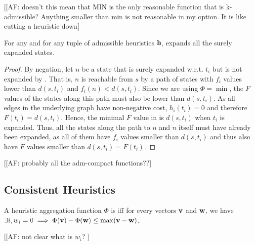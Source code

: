 [[AF: doesn't this mean that MIN is the only reasonable function that is k-admissible? Anything smaller than min is not reasonable in my option. It is like cutting a heuristic down]

\begin{theorem}
  \label{the:kastarmin-surely}
  For any \kgs and for any tuple of admissible heuristics $\mathbf{h}$, \kastarmin expands all the surely expanded states.
\end{theorem}
\begin{proof}
  By negation, let $n$ be a state that is surely expanded w.r.t. $t_i$ but is not expanded by \kastarmin.
  That is, $n$ is reachable from $s$ by a path of states with $f_i$  values lower than $d(s, t_i)$ and $f_i(n) < d(s, t_i)$.
  Since we are using $\Phi = \min$, the $F$ values of the states along this path must also be lower than $d(s, t_i)$.
  As all edges in the underlying graph have non-negative cost, $h_i(t_i) = 0$ and therefore $F(t_i) = d(s, t_i)$.
  Hence, the minimal $F$ value in \open is $d(s, t_i)$ when $t_i$ is expanded.
  Thus, all the states along the path to $n$ and $n$ itself must have already been expanded, as all of them have $f_i$ values smaller than $d(s, t_i)$ and thus also have $F$ values smaller than $d(s, t_i) = F(t_i)$.
\end{proof}


[[AF: probably all the adm-compact functions??]

\subsection{Consistent Heuristics}

\begin{definition}
  A heuristic aggregation function $\Phi$ is \emph{\axiomcons} iff for every vectors $\mathbf{v}$ and $\mathbf{w}$, we have $\exists i, w_i = 0 \implies \Phi(\mathbf{v}) - \Phi(\mathbf{w}) \leq \max (\mathbf{v}-\mathbf{w})$.
\end{definition}

[[AF: not clear what is $w_i$? ]


